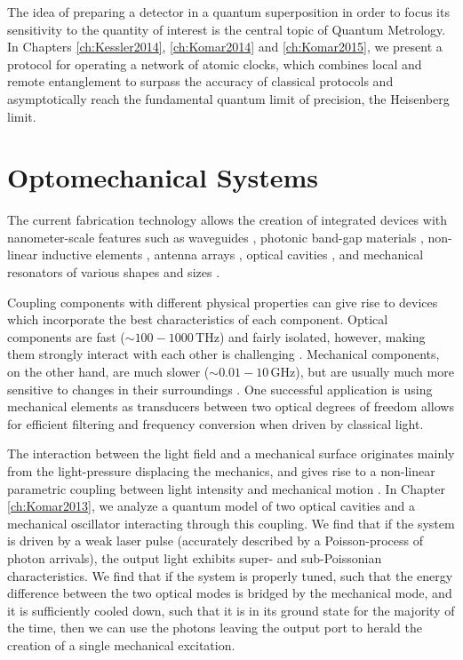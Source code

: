 The idea of preparing a detector in a quantum
superposition in order to focus its sensitivity to the quantity of interest is
the central topic of Quantum Metrology. In Chapters \ref{ch:Kessler2014},
\ref{ch:Komar2014} and \ref{ch:Komar2015}, we present a
protocol for operating a network of atomic clocks, which combines local and
remote entanglement to surpass the accuracy of classical protocols and
asymptotically reach the fundamental quantum limit of precision, the Heisenberg limit. 


 
 
 
 
 
 
\section{Optomechanical Systems}
The current fabrication technology allows the creation of integrated devices
with nanometer-scale features such as waveguides \cite{Mekis1996}, photonic
band-gap materials \cite{Foresi1997}, non-linear inductive elements
\cite{Makhlin1999}, antenna arrays \cite{Yu2014}, optical cavities
\cite{Painter2001}, and mechanical resonators of various shapes and sizes
\cite{Aspelmeyer2014}.

Coupling components with different physical properties can give rise to devices
which incorporate the best characteristics of each component.
Optical components are fast ($\sim 100-1000\,\mathrm{THz}$) and fairly isolated,
however, making them strongly interact with each other is challenging
\cite{Chang2007}.
Mechanical components, on the other hand, are much slower ($\sim
0.01-10\,\mathrm{GHz}$), but are usually much more sensitive to changes in their
surroundings \cite{Aspelmeyer2014}. One successful application is using
mechanical elements as transducers between two optical degrees of freedom allows
for efficient filtering and frequency conversion \cite{Eichenfield2009} when
driven by classical light.

The interaction between the light field and a mechanical surface originates
mainly from the light-pressure displacing the mechanics, and gives rise to a
non-linear parametric coupling between light intensity and mechanical motion
\cite{Meystre2013}. In Chapter \ref{ch:Komar2013}, we analyze a quantum model of
two optical cavities and a mechanical oscillator interacting through this
coupling. We find that if the system is driven by a weak laser pulse (accurately
described by a Poisson-process of photon arrivals), the output light exhibits
super- and sub-Poissonian characteristics.
We find that if the system is properly tuned, such that the energy difference
between the two optical modes is bridged by the mechanical mode, and it is
sufficiently cooled down, such that it is in its ground state for the majority
of the time, then we can use the photons leaving the output port to herald the
creation of a single mechanical excitation.

